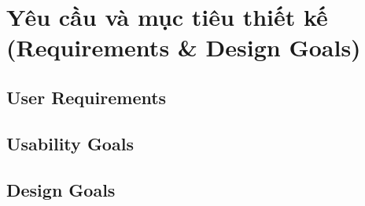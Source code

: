 \section{Yêu cầu và mục tiêu thiết kế (Requirements \& Design Goals)}

\subsection{User Requirements}

\subsection{Usability Goals}

\subsection{Design Goals}
